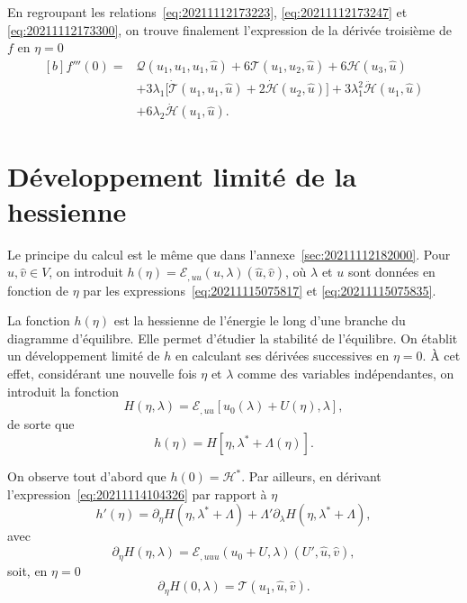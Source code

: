 \documentclass[12pt, final]{amsart}
\begin{document}
En regroupant les relations~\eqref{eq:20211112173223},
\eqref{eq:20211112173247} et \eqref{eq:20211112173300}, on trouve finalement
l'expression de la dérivée troisième de \(f\) en \(\eta=0\)
\begin{equation}
\label{eq:20211112182402}
  \begin{aligned}[b]
    f'''(0)={}&\mathcal Q(u_1, u_1, u_1, \hat{u})
    +6\mathcal T(u_1, u_2, \hat{u})+6\mathcal H(u_3, \hat{u})\\
    &+3\lambda_1\bigl[\dot{\mathcal T}(u_1, u_1, \hat{u})
    +2\dot{\mathcal H}(u_2, \hat{u})\bigr]
    +3\lambda_1^2\ddot{\mathcal H}(u_1, \hat{u})\\
    &+6\lambda_2\dot{\mathcal H}(u_1, \hat{u}).
  \end{aligned}
\end{equation}

\section{Développement limité de la hessienne}
\label{sec:20211115081016}

Le principe du calcul est le même que dans
l'annexe~\ref{sec:20211112182000}. Pour \(\hat{u}, \hat{v}\in V\), on introduit
\(h(\eta)=\mathcal E_{,uu}(u, \lambda)(\hat{u}, \hat{v})\), où \(\lambda\) et
\(u\) sont données en fonction de \(\eta\) par les
expressions~\eqref{eq:20211115075817} et \eqref{eq:20211115075835}.

La fonction \(h(\eta)\) est la hessienne de l'énergie le long d'une branche du
diagramme d'équilibre. Elle permet d'étudier la stabilité de l'équilibre. On
établit un développement limité de \(h\) en calculant ses dérivées successives
en \(\eta=0\). \`A cet effet, considérant une nouvelle fois \(\eta\) et
\(\lambda\) comme des variables indépendantes, on introduit la fonction
\begin{equation}
  H(\eta, \lambda)=\mathcal E_{,uu}[u_0(\lambda)+U(\eta), \lambda],
\end{equation}
de sorte que
\begin{equation}
  \label{eq:20211114104326}
  h(\eta)=H[\eta, \lambda^\ast+\Lambda(\eta)].
\end{equation}

On observe tout d'abord que \(h(0)=\mathcal H^\ast\). Par ailleurs, en dérivant
l'expression~\eqref{eq:20211114104326} par rapport à \(\eta\)
\begin{equation}
  \label{eq:20211114110210}
  h'(\eta)=\partial_\eta H(\eta, \lambda^\ast+\Lambda)
  +\Lambda'\partial_\lambda H(\eta, \lambda^\ast+\Lambda),
\end{equation}
avec
\begin{equation}
  \label{eq:20211114110852}
  \partial_\eta H(\eta, \lambda)=\mathcal E_{,uuu}(u_0+U, \lambda)(U', \hat{u}, \hat{v}),
\end{equation}
soit, en \(\eta=0\)
\begin{equation}
  \label{eq:20211114110230}
  \partial_\eta H(0, \lambda)=\mathcal T(u_1, \hat{u}, \hat{v}).
\end{equation}
\end{document}

